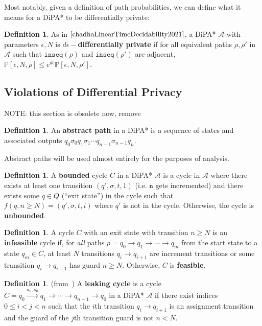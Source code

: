 \documentclass[12pt]{article}
\newcommand{\PP}{\mathbb{P}}
\theoremstyle{definition}
\newtheorem{defn}[thm]{Definition}
\begin{document}
Most notably, given a definition of path probabilities, we can define what it means for a DiPA* to be differentially private:
\begin{defn}
	As in $\cite{chadhaLinearTimeDecidability2021}$, a DiPA* $\mathcal{A}$ with parameters $\epsilon, N$ is \textbf{$d\epsilon-$differentially private} if for all equivalent paths $\rho, \rho'$ in $\mathcal{A}$ such that $\texttt{inseq}(\rho)$ and $\texttt{inseq}(\rho')$ are adjacent, $\PP[\epsilon, N, \rho] \leq e^{d\epsilon}\PP[\epsilon, N, \rho']$.
\end{defn}



\subsection{Violations of Differential Privacy}

NOTE: this section is obsolete now, remove

\begin{defn}
	An \textbf{abstract path} in a DiPA* is a sequence of states and associated outputs $q_0\sigma_0q_1\sigma_1\cdots q_{n-1}\sigma_{n-1}q_n$. 
\end{defn}
Abstract paths will be used almost entirely for the purposes of analysis.

\begin{defn}
A \textbf{bounded} cycle $C$ in a DiPA* $\mathcal{A}$ is a cycle in $\mathcal{A}$ where there exists at least one transition $(q', \sigma, t, 1)$ (i.e. $\texttt{n}$ gets incremented) and there exists some $q\in Q$ (``exit state'') in the cycle such that $f(q, n \geq N) = (q', \sigma, t, i)$ where $q'$ is not in the cycle. Otherwise, the cycle is \textbf{unbounded}. 
\end{defn}

\begin{defn}
A cycle $C$ with an exit state with transition $n\geq N$ is an \textbf{infeasible} cycle if, for \textit{all} paths $\rho = q_0\to q_1\to \cdots \to q_m$ from the start state to a state $q_m \in C$, at least $N$ transitions $q_i \to q_{i+1}$ are increment transitions or some transition $q_i \to q_{i+1}$ has guard $n\geq N$. Otherwise, $C$ is \textbf{feasible}.
\end{defn}

\begin{defn} (from~\cite{chadhaLinearTimeDecidability2021}) A \textbf{leaking cycle} is a cycle $C = q_0\xrightarrow{a_0, o_0}q_1\to \cdots\to q_{n-1}\to q_0$ in a DiPA* $\mathcal{A}$ if there exist indices $0\leq i< j<n$ such that the $i$th transition $q_i\to q_{i+1}$ is an assignment transition and the guard of the $j$th transition guard is not $n < N$. 
\end{defn}
\end{document}
